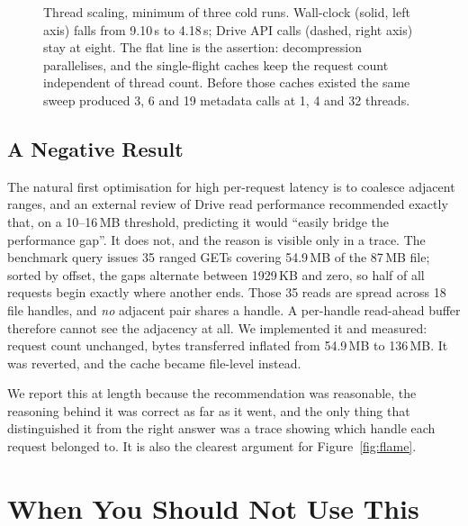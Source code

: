 \documentclass[sigconf, nonacm]{acmart}
\begin{document}
\begin{figure}[t]
\centering

\caption{Thread scaling, minimum of three cold runs. Wall-clock (solid, left
axis) falls from 9.10\,s to 4.18\,s; Drive API calls (dashed, right axis) stay
at eight. The flat line is the assertion: decompression parallelises, and the
single-flight caches keep the request count independent of thread count. Before
those caches existed the same sweep produced 3, 6 and 19 metadata calls at 1, 4
and 32 threads.}
\label{fig:threads}
\end{figure}

\subsection{A Negative Result}

The natural first optimisation for high per-request latency is to coalesce
adjacent ranges, and an external review of Drive read performance recommended
exactly that, on a 10--16\,MB threshold, predicting it would ``easily bridge the
performance gap''. It does not, and the reason is visible only in a trace. The
benchmark query issues 35 ranged GETs covering 54.9\,MB of the 87\,MB file;
sorted by offset, the gaps alternate between 1929\,KB and zero, so half of all
requests begin exactly where another ends. Those 35 reads are spread across 18
file handles, and \emph{no} adjacent pair shares a handle. A per-handle
read-ahead buffer therefore cannot see the adjacency at all. We implemented it
and measured: request count unchanged, bytes transferred inflated from
54.9\,MB to 136\,MB. It was reverted, and the cache became file-level instead.

We report this at length because the recommendation was reasonable, the
reasoning behind it was correct as far as it went, and the only thing that
distinguished it from the right answer was a trace showing which handle each
request belonged to. It is also the clearest argument for
Figure~\ref{fig:flame}.

\section{When You Should Not Use This}
\label{sec:notthis}
\end{document}
